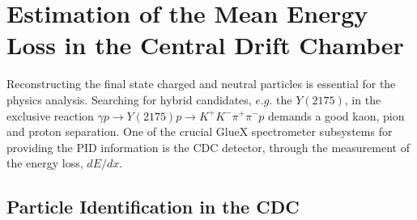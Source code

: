 \chapter{Estimation of the Mean Energy Loss in the Central Drift Chamber}
\label{p.3}

Reconstructing the final state charged and neutral particles is essential for the physics analysis. Searching for hybrid candidates, $e.g.$ the $Y(2175)$, in the exclusive reaction $\gamma p \rightarrow Y(2175) p \rightarrow K^{+}K^{-}\pi^{+}\pi^{-}p$ demands a good kaon, pion and proton separation. One of the crucial GlueX spectrometer subsystems for providing the PID information is the CDC detector, through the measurement of the energy loss, $dE/dx$.

\section{Particle Identification in the CDC}
\label{p.3.1}

